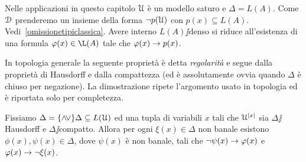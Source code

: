 %
% 
Nelle applicazioni in questo capitolo $\EuScript U$ \`e un modello saturo e $\Delta=L(A)$. Come $\EuScript D$ prenderemo un insieme della forma $\neg p(\EuScript U)$ con $p(x)\subseteq L(A)$. Vedi~\ref{omissionetipiclassica}. Avere interno $L(A)\jj$denso si riduce all'esistenza di una formula $\phi(x)\in\L(A)$ tale che $\varphi(x)\rightarrow p(x)$.

In topologia generale la seguente propriet\`a \`e detta \emph{regolarit\`a\/} e segue dalla propriet\`a di Hausdorff e dalla compattezza (ed \`e assolutamente ovvia quando $\Delta$ \`e chiuso per negazione). La dimostrazione ripete l'argomento usato in topologia ed \`e riportata solo per completezza.


\begin{proposition}\label{prop_regolarita}
Fissiamo $\Delta=\{\wedge\!\vee\}\Delta\subseteq L(\EuScript U)$ ed una tupla di variabili $x$ tali che $\EuScript U^{|x|}$ sia $\Delta\jj$Haus\-dorff e $\Delta\jj$compatto. Allora per ogni $\xi(x)\in\Delta$ non banale esistono $\phi(x),\psi(x)\in\Delta$, dove $\psi(x)$ \`e non banale, tali che $\neg\psi(x)\rightarrow\varphi(x)$ e $\varphi(x)\rightarrow\neg\xi(x)$.
\end{proposition}

